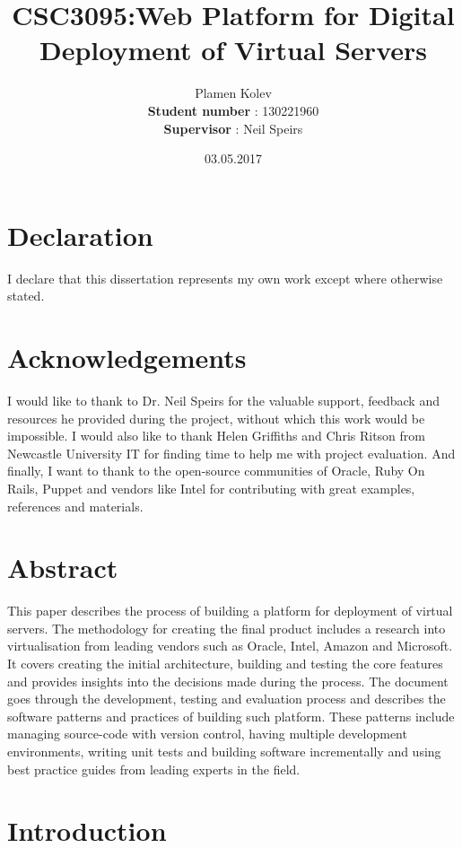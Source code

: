 \documentclass{article}
\title{CSC3095:Web Platform for Digital Deployment of Virtual Servers}
\date{03.05.2017}
\author{Plamen Kolev\\ \textbf{Student number} : 130221960\\ \textbf{Supervisor} : Neil Speirs}
\begin{document}
\maketitle

\newpage
\section{Declaration}
I declare that this dissertation represents my own work except where otherwise stated.

\section{Acknowledgements}
I would like to thank to Dr. Neil Speirs for the valuable support, feedback and resources he provided during the project, without which this work would be impossible. I would also like to thank  Helen Griffiths and Chris Ritson from Newcastle University IT for finding time to help me with project evaluation.  And finally, I want to thank to the open-source communities of Oracle, Ruby On Rails, Puppet and vendors like Intel for contributing with great examples, references and materials. 

\newpage
\section{Abstract}

This paper describes the process of building a platform for deployment of virtual servers. The methodology for creating the final product includes a research into virtualisation from leading vendors such as Oracle, Intel, Amazon and Microsoft. It covers creating the initial architecture, building and testing the core features and provides insights into the decisions made during the process. The document goes through the development, testing and evaluation process and describes the software patterns and practices of building such platform. These patterns include managing source-code with version control, having multiple development environments, writing unit tests and building software incrementally and using best practice guides from leading experts in the field.

\newpage
\tableofcontents
\newpage
\listoffigures
\newpage
{}

\newpage
\section{Introduction}
\end{document}
